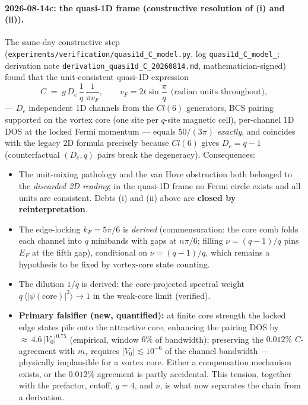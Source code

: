 \paragraph{2026-08-14c: the quasi-1D frame (constructive resolution of (i) and (ii)).}
The same-day constructive step (\texttt{experiments/\allowbreak verification/\allowbreak quasi1d\_\allowbreak C\_\allowbreak model.py},
log \texttt{quasi1d\_\allowbreak C\_\allowbreak model\_}; derivation note
\texttt{derivation\_\allowbreak quasi1d\_\allowbreak C\_\allowbreak 20260814.md}, mathematician-signed) found that the
unit-consistent quasi-1D expression
\begin{equation}
C \;=\; g\,D_e\,\frac{1}{q}\,\frac{1}{\pi v_F},
\qquad v_F = 2t\sin\frac{\pi}{q}\ \ \text{(radian units throughout)},
\end{equation}
--- $D_e$ independent 1D channels from the $Cl(6)$ generators, BCS pairing supported on
the vortex core (one site per $q$-site magnetic cell), per-channel 1D DOS at the locked
Fermi momentum --- equals $50/(3\pi)$ \emph{exactly}, and coincides with the legacy 2D
formula precisely because $Cl(6)$ gives $D_e = q-1$ (counterfactual $(D_e,q)$ pairs break
the degeneracy). Consequences:
\begin{itemize}
\item The unit-mixing pathology and the van Hove obstruction both belonged to the
\emph{discarded 2D reading}; in the quasi-1D frame no Fermi circle exists and all units
are consistent. Debts (i) and (ii) above are \textbf{closed by reinterpretation}.
\item The edge-locking $k_F = 5\pi/6$ is \emph{derived} (commensuration: the core comb
folds each channel into $q$ minibands with gaps at $n\pi/6$; filling $\nu = (q-1)/q$ pins
$E_F$ at the fifth gap), conditional on $\nu = (q-1)/q$, which remains a hypothesis to be
fixed by vortex-core state counting.
\item The dilution $1/q$ is derived: the core-projected spectral weight
$q\,\langle|\psi(\mathrm{core})|^2\rangle \to 1$ in the weak-core limit (verified).
\item \textbf{Primary falsifier (new, quantified):} at finite core strength the locked
edge states pile onto the attractive core, enhancing the pairing DOS by
${\approx}\,4.6\,|V_0|^{0.75}$ (empirical, window $6\%$ of bandwidth); preserving the
$0.012\%$ $C$-agreement with $m_\tau$ requires $|V_0| \lesssim 10^{-6}$ of the channel
bandwidth --- physically implausible for a vortex core. Either a compensation mechanism
exists, or the $0.012\%$ agreement is partly accidental. This tension, together with the
prefactor, cutoff, $g=4$, and $\nu$, is what now separates the chain from a derivation.
\end{itemize}

